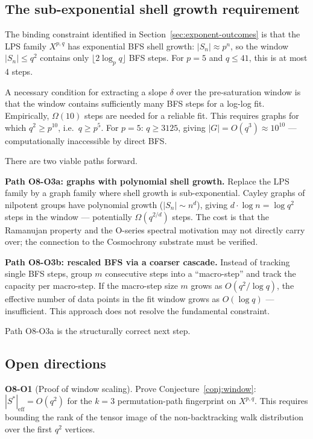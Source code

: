\documentclass[11pt,a4paper]{article}
\theoremstyle{definition}
\theoremstyle{remark}
\begin{document}
  \subsection{The sub-exponential shell growth requirement}
    \label{sec:discussion-subexp}

    The binding constraint identified in Section~\ref{sec:exponent-outcomes} is that
    the LPS family $X^{p,q}$ has exponential BFS shell growth: $|S_n| \approx p^n$,
    so the window $|S_n| \leq q^2$ contains only $\lfloor 2\log_p q \rfloor$ BFS steps.
    For $p=5$ and $q \leq 41$, this is at most 4 steps.

    A necessary condition for extracting a slope $\delta$ over the pre-saturation window
    is that the window contains sufficiently many BFS steps for a log-log fit.
    Empirically, $\Omega(10)$ steps are needed for a reliable fit.
    This requires graphs for which $q^2 \geq p^{10}$, i.e.\ $q \geq p^5$.
    For $p=5$: $q \geq 3125$, giving $|G| = O(q^3) \approx 10^{10}$ — computationally
    inaccessible by direct BFS.

    There are two viable paths forward.

    \medskip
    \noindent
    \textbf{Path O8-O3a: graphs with polynomial shell growth.}
    Replace the LPS family by a graph family where shell growth is sub-exponential.
    Cayley graphs of nilpotent groups have polynomial growth ($|S_n| \sim n^d$), giving
    $d \cdot \log n = \log q^2$ steps in the window — potentially $\Omega(q^{2/d})$ steps.
    The cost is that the Ramanujan property and the O-series spectral motivation may not
    directly carry over; the connection to the Cosmochrony substrate must be verified.

    \medskip
    \noindent
    \textbf{Path O8-O3b: rescaled BFS via a coarser cascade.}
    Instead of tracking single BFS steps, group $m$ consecutive steps into a
    ``macro-step'' and track the capacity per macro-step.
    If the macro-step size $m$ grows as $O(q^2 / \log q)$, the effective number of
    data points in the fit window grows as $O(\log q)$ — insufficient.
    This approach does not resolve the fundamental constraint.

    Path O8-O3a is the structurally correct next step.

  \subsection{Open directions}
    \label{sec:open}

    \medskip
    \noindent
    \textbf{O8-O1} (Proof of window scaling).
    Prove Conjecture~\ref{conj:window}: $|S^*|_\mathrm{eff} = O(q^2)$ for the $k=3$
    permutation-path fingerprint on $X^{p,q}$.
    This requires bounding the rank of the tensor image of the non-backtracking walk
    distribution over the first $q^2$ vertices.
\end{document}
